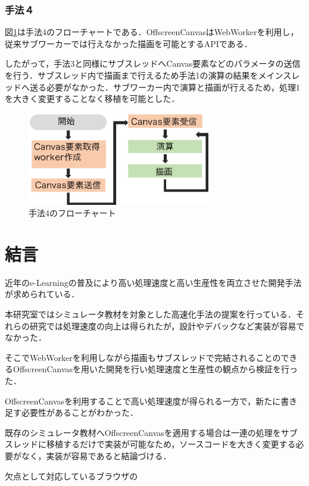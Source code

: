 \documentclass[a4j,12pt]{jsarticle}
\begin{document}
\subsubsection{手法４}
図\ref{fig:offsc}は手法4のフローチャートである．OffscreenCanvasはWebWorkerを利用し，従来サブワーカーでは行えなかった描画を可能とするAPIである．

したがって，手法3と同様にサブスレッドへCanvas要素などのパラメータの送信を行う．サブスレッド内で描画まで行えるため手法1の演算の結果をメインスレッドへ送る必要がなかった．サブワーカー内で演算と描画が行えるため，処理1を大きく変更することなく移植を可能とした．
\begin{figure}[H]
 \begin{center}
  \includegraphics[width=80mm]{offsc_chart2.pdf}
 \end{center}
 \caption{手法4のフローチャート}
 \label{fig:offsc}
\end{figure}

\newpage


\section{結言}
近年のe-Learningの普及により高い処理速度と高い生産性を両立させた開発手法が求められている．

本研究室ではシミュレータ教材を対象とした高速化手法の提案を行っている．それらの研究では処理速度の向上は得られたが，設計やデバックなど実装が容易でなかった．

そこでWebWorkerを利用しながら描画もサブスレッドで完結されることのできるOffscreenCanvasを用いた開発を行い処理速度と生産性の観点から検証を行った．

OffscreenCanvasを利用することで高い処理速度が得られる一方で，新たに書き足す必要性があることがわかった．

既存のシミュレータ教材へOffscreenCanvasを適用する場合は一連の処理をサブスレッドに移植するだけで実装が可能なため，ソースコードを大きく変更する必要がなく，実装が容易であると結論づける．

欠点として対応しているブラウザの
\end{document}
